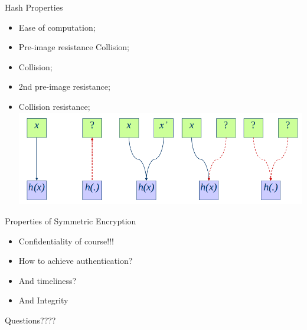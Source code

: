 \documentclass[12pt,table,xcolor={dvipsnames}]{beamer}
\begin{document}
\begin{frame}{Hash Properties}
\begin{itemize}
\item Ease of computation;\pause
\item Pre-image resistance Collision;\pause
\item Collision;\pause
\item 2nd pre-image resistance;\pause
\item Collision resistance;\\\pause
\includegraphics[scale=.3]{hash_properties.png}
\end{itemize}
\end{frame}


\begin{frame}{Properties of Symmetric Encryption}
\begin{itemize}
\item Confidentiality of course!!!
\item How to achieve authentication?
\item And timeliness?
\item And Integrity
\end{itemize}
\end{frame}

{
\begin{frame}

{\LARGE Questions????}

\end{frame}
}
\end{document}
